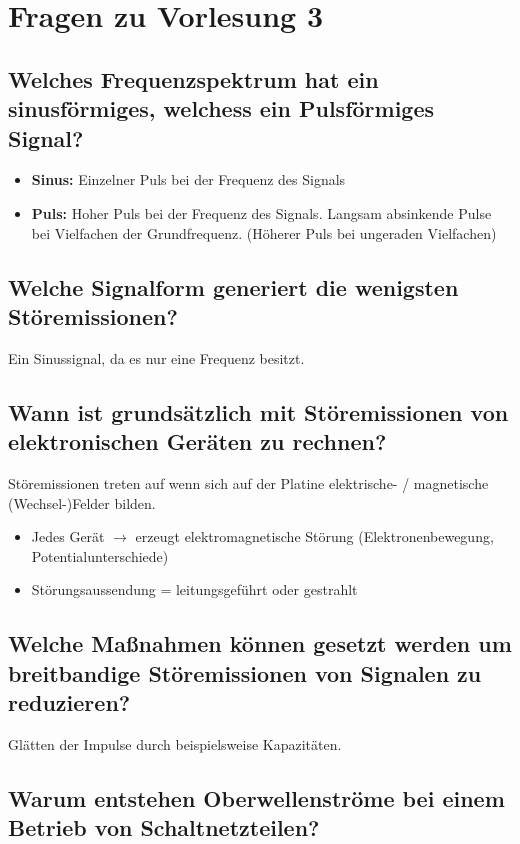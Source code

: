 \section{Fragen zu Vorlesung 3}

\subsection{Welches Frequenzspektrum hat ein sinusförmiges, welchess ein Pulsförmiges Signal?}
\begin{itemize}
  \item \textbf{Sinus:} Einzelner Puls bei der Frequenz des Signals
  \item \textbf{Puls:} Hoher Puls bei der Frequenz des Signals. Langsam absinkende Pulse bei Vielfachen der Grundfrequenz. (Höherer Puls bei ungeraden Vielfachen)
\end{itemize}

\subsection{Welche Signalform generiert die wenigsten Störemissionen?}
Ein Sinussignal, da es nur eine Frequenz besitzt.

\subsection{Wann ist grundsätzlich mit Störemissionen von elektronischen Geräten zu rechnen?}

Störemissionen treten auf wenn sich auf der Platine elektrische- / magnetische (Wechsel-)Felder bilden.

\begin{itemize}
  \item Jedes Gerät \(\rightarrow\) erzeugt elektromagnetische Störung (Elektronenbewegung, Potentialunterschiede)
  \item Störungsaussendung = leitungsgeführt oder gestrahlt
\end{itemize}

\subsection{Welche Maßnahmen können gesetzt werden um breitbandige Störemissionen von Signalen zu reduzieren?}
Glätten der Impulse durch beispielsweise Kapazitäten.

\subsection{Warum entstehen Oberwellenströme bei einem Betrieb von Schaltnetzteilen?}

